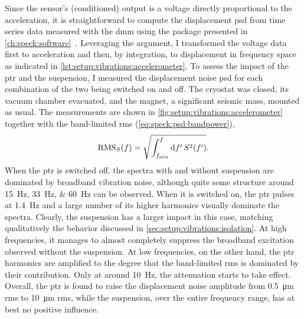 Since the sensor's (conditioned) output is a voltage directly proportional to the acceleration, it is straightforward to compute the displacement \gls{psd} from time series data measured with the \gls{dmm} using the \pyspeck package presented in \cref{ch:speck:software}~\cite{Hangleiter_pyspeck}.
Leveraging the  argument, I transformed the voltage data first to acceleration and then, by integration, to displacement in frequency space as indicated in \cref{lst:setup:vibrations:accelerometer}.
To assess the impact of the \gls{ptr} and the suspension, I measured the displacement noise \gls{psd} for each combination of the two being switched on and off.
The cryostat was closed, its vacuum chamber evacuated, and the magnet, a significant seismic mass, mounted as usual.
The measurements are shown in \cref{fig:setup:vibrations:accelerometer} together with the band-limited \gls{rms} (\cf \cref{eq:speck:psd:bandpower}),
\begin{equation}\label{eq:setup:vibrations:rms}
    \operatorname{RMS}_S(f) = \sqrt{\int_{f_{\mathrm{min}}}^{f}\dd{f^\prime}S^2(f^\prime)}.
\end{equation}
When the \gls{ptr} is switched off, the spectra with and without suspension are dominated by broadband vibration noise, although quite some structure around \qtylist{15;33;60}{\hertz} can be observed.
When it is switched on, the \gls{ptr} pulses at \qty{1.4}{\hertz} and a large number of its higher harmonics visually dominate the spectra.
Clearly, the suspension has a larger impact in this case, matching qualitatively the behavior discussed in \cref{sec:setup:vibrations:isolation}.
At high frequencies, it manages to almost completely suppress the broadband excitation observed without the suspension.
At low frequencies, on the other hand, the \gls{ptr} harmonics are amplified to the degree that the band-limited \gls{rms} is dominated by their contribution.
Only at around \qty{10}{\hertz}, the attenuation starts to take effect.
Overall, the \gls{ptr} is found to raise the displacement noise amplitude from \qty{0.5}{\micro\meter} \gls{rms} to \qty{10}{\micro\meter} \gls{rms}, while the suspension, over the entire frequency range, has at best no positive influence.

